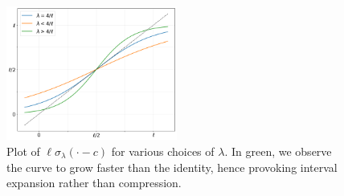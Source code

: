 \documentclass[11pt]{scrartcl}
\begin{document}
\begin{figure}[H]\label{img:sigmoid}
\centering
\includegraphics[width=0.5\textwidth]{img/sigmoids.png}
\caption{Plot of $\ell\sigma_\lambda(\cdot - c)$ for various choices of $\lambda$. In green, we observe the curve to grow faster than the identity, hence provoking interval expansion rather than compression.}
\end{figure}




\appendix
\end{document}
